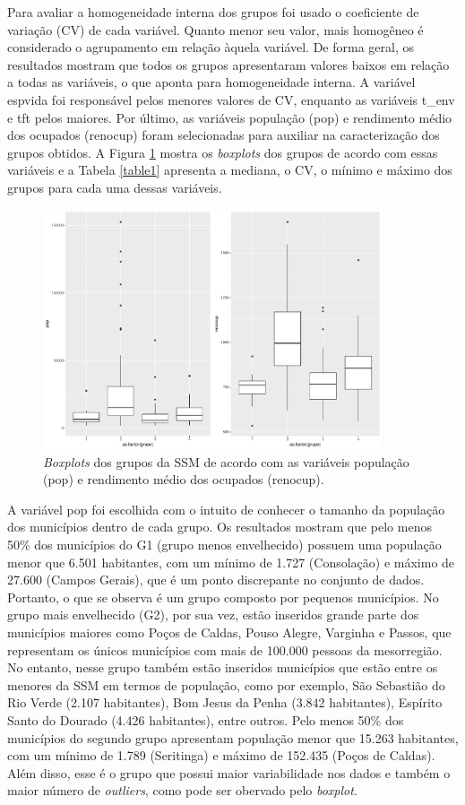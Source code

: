\documentclass[10pt,twoside]{article}
\begin{document}
Para avaliar a homogeneidade interna dos grupos foi usado o coeficiente de variação (CV) de cada variável. Quanto menor seu valor, mais homogêneo é considerado o agrupamento em relação àquela variável. De forma geral, os resultados mostram que todos os grupos apresentaram valores baixos em relação a todas as variáveis, o que aponta para homogeneidade interna. A variável espvida foi responsável pelos menores valores de CV, enquanto as variáveis t\_env e tft pelos maiores.
Por último, as variáveis população (pop) e rendimento médio dos ocupados (renocup) foram selecionadas para auxiliar na caracterização dos grupos obtidos. A Figura \ref{box22} mostra os \textit{boxplots} dos grupos de acordo com essas variáveis e a Tabela \ref{table1} apresenta a mediana, o CV, o mínimo e máximo dos grupos para cada uma dessas variáveis.

\begin{figure}[htp!]
\begin{center}
\includegraphics[width=10cm]{boxplots2}
\end{center}
\caption{\textit{Boxplots} dos grupos da SSM de acordo com as variáveis população (pop) e rendimento médio dos ocupados (renocup).} \label{box22}
\end{figure}
\FloatBarrier

A variável pop foi escolhida com o intuito de conhecer o tamanho da população dos municípios dentro de cada grupo. Os resultados mostram que pelo menos 50\% dos municípios do G1 (grupo menos envelhecido) possuem uma população menor que 6.501 habitantes, com um mínimo de 1.727 (Consolação) e máximo de 27.600 (Campos Gerais), que é um ponto discrepante no conjunto de dados. Portanto, o que se observa é um grupo composto por pequenos municípios. No grupo mais envelhecido (G2), por sua vez, estão inseridos grande parte dos municípios maiores como Poços de Caldas, Pouso Alegre, Varginha e Passos, que representam os únicos municípios com mais de 100.000 pessoas da mesorregião. No entanto, nesse grupo também estão inseridos municípios que estão entre os menores da SSM em termos de população, como por exemplo, São Sebastião do Rio Verde (2.107 habitantes), Bom Jesus da Penha (3.842 habitantes), Espírito Santo do Dourado (4.426 habitantes), entre outros. Pelo menos 50\% dos municípios do segundo grupo apresentam população menor que 15.263 habitantes, com um mínimo de 1.789 (Seritinga) e máximo de 152.435 (Poços de Caldas). Além disso, esse é o grupo que possui maior variabilidade nos dados e também o maior número de \textit{outliers}, como pode ser obervado pelo \textit{boxplot}.
\end{document}
